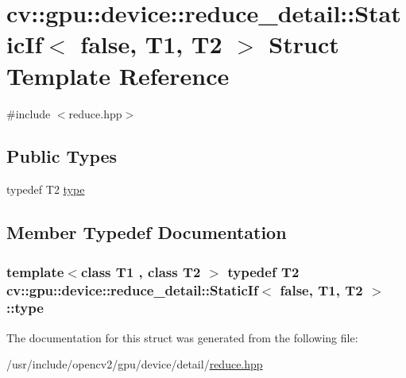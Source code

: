 \hypertarget{structcv_1_1gpu_1_1device_1_1reduce__detail_1_1StaticIf_3_01false_00_01T1_00_01T2_01_4}{\section{cv\-:\-:gpu\-:\-:device\-:\-:reduce\-\_\-detail\-:\-:Static\-If$<$ false, T1, T2 $>$ Struct Template Reference}
\label{structcv_1_1gpu_1_1device_1_1reduce__detail_1_1StaticIf_3_01false_00_01T1_00_01T2_01_4}
}


{\ttfamily \#include $<$reduce.\-hpp$>$}

\subsection*{Public Types}
\begin{DoxyCompactItemize}
\item 
typedef T2 \hyperlink{structcv_1_1gpu_1_1device_1_1reduce__detail_1_1StaticIf_3_01false_00_01T1_00_01T2_01_4_a1d46703241b746c75cc3222a511878fd}{type}
\end{DoxyCompactItemize}


\subsection{Member Typedef Documentation}
\hypertarget{structcv_1_1gpu_1_1device_1_1reduce__detail_1_1StaticIf_3_01false_00_01T1_00_01T2_01_4_a1d46703241b746c75cc3222a511878fd}{
\subsubsection[{type}]{\setlength{\rightskip}{0pt plus 5cm}template$<$class T1 , class T2 $>$ typedef T2 {\bf cv\-::gpu\-::device\-::reduce\-\_\-detail\-::\-Static\-If}$<$ {\bf false}, T1, T2 $>$\-::{\bf type}}}\label{structcv_1_1gpu_1_1device_1_1reduce__detail_1_1StaticIf_3_01false_00_01T1_00_01T2_01_4_a1d46703241b746c75cc3222a511878fd}


The documentation for this struct was generated from the following file\-:\begin{DoxyCompactItemize}
\item 
/usr/include/opencv2/gpu/device/detail/\hyperlink{detail_2reduce_8hpp}{reduce.\-hpp}\end{DoxyCompactItemize}
